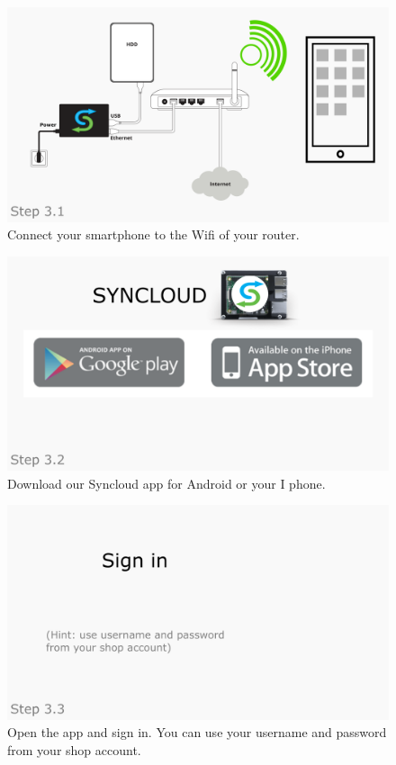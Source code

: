 \documentclass[a4paper,12pt]{article}
\begin{document}
\begin{figure}[htbp!]
	\centering
	\includegraphics[width=0.7\linewidth]{../frames/27.png}
	\caption{Connect your smartphone to the Wifi of your router.}
	\label{fig:15}
\end{figure}

\begin{figure}[htbp!]
	\centering
	\includegraphics[width=0.7\linewidth]{../frames/28.png}
	\caption{Download our Syncloud app for Android or your I phone.}
	\label{fig:16}
\end{figure}

\begin{figure}[htbp!]
	\centering
	\includegraphics[width=0.7\linewidth]{../frames/29.png}
	\caption{Open the app and sign in. You can use your username and password from your shop account.}
	\label{fig:17}
\end{figure}
\end{document}
